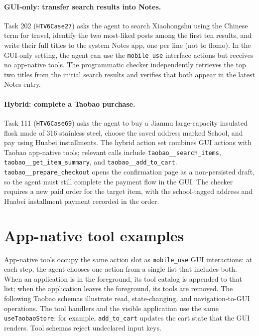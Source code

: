 \paragraph{GUI-only: transfer search results into Notes.}
Task 202 (\texttt{HTV6Case27}) asks the agent to search Xiaohongshu using the Chinese term for travel, identify the two most-liked posts among the first ten results, and write their full titles to the system Notes app, one per line (not to flomo). In the GUI-only setting, the agent can use the \texttt{mobile\_use} interface actions but receives no app-native tools. The programmatic checker independently retrieves the top two titles from the initial search results and verifies that both appear in the latest Notes entry.

\paragraph{Hybrid: complete a Taobao purchase.}
Task 111 (\texttt{HTV6Case69}) asks the agent to buy a Jianmu large-capacity insulated flask made of 316 stainless steel, choose the saved address marked School, and pay using Huabei installments. The hybrid action set combines GUI actions with Taobao app-native tools; relevant calls include \texttt{taobao\_\_search\_items}, \texttt{taobao\_\_get\_item\_summary}, and \texttt{taobao\_\_add\_to\_cart}. \texttt{taobao\_\_prepare\_checkout} opens the confirmation page as a non-persisted draft, so the agent must still complete the payment flow in the GUI. The checker requires a new paid order for the target item, with the school-tagged address and Huabei installment payment recorded in the order.

\section{App-native tool examples}
\label{app:tool-schema}
App-native tools occupy the same action slot as \texttt{mobile\_use} GUI interactions: at each step, the agent chooses one action from a single list that includes both. When an application is in the foreground, its tool catalog is appended to that list; when the application leaves the foreground, its tools are removed. The following Taobao schemas illustrate read, state-changing, and navigation-to-GUI operations. The tool handlers and the visible application use the same \texttt{useTaobaoStore}: for example, \texttt{add\_to\_cart} updates the cart state that the GUI renders. Tool schemas reject undeclared input keys.

